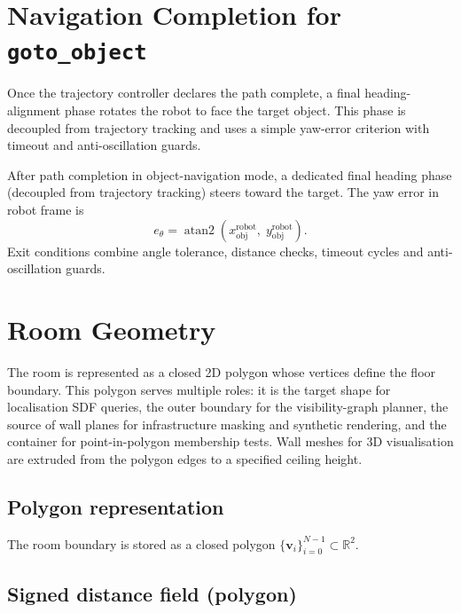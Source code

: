 \documentclass[a4paper, 11pt]{article}
\DeclareMathOperator{\atantwo}{atan2}
\newcommand{\R}{\mathbb{R}}
\newcommand{\vect}[1]{\bm{#1}}
\begin{document}
\section{Navigation Completion for \texttt{goto\_object}}\label{sec:navcompl}

Once the trajectory controller declares the path complete, a final
heading-alignment phase rotates the robot to face the target object.
This phase is decoupled from trajectory tracking and uses a simple
yaw-error criterion with timeout and anti-oscillation guards.

After path completion in object-navigation mode, a dedicated final heading
phase (decoupled from trajectory tracking) steers toward the target.
The yaw error in robot frame is
\begin{equation}
  e_\theta = \atantwo(x_{\text{obj}}^{\text{robot}},\;
                      y_{\text{obj}}^{\text{robot}}).
\end{equation}
Exit conditions combine angle tolerance, distance checks, timeout cycles
and anti-oscillation guards.

\section{Room Geometry}\label{sec:room-geom}

The room is represented as a closed 2D polygon whose vertices define
the floor boundary.  This polygon serves multiple roles: it is the
target shape for localisation SDF queries, the outer boundary for the
visibility-graph planner, the source of wall planes for infrastructure
masking and synthetic rendering, and the container for
point-in-polygon membership tests.  Wall meshes for 3D visualisation
are extruded from the polygon edges to a specified ceiling height.

\subsection{Polygon representation}

The room boundary is stored as a closed polygon
$\{\vect{v}_i\}_{i=0}^{N-1} \subset \R^2$.

\subsection{Signed distance field (polygon)}
\end{document}
